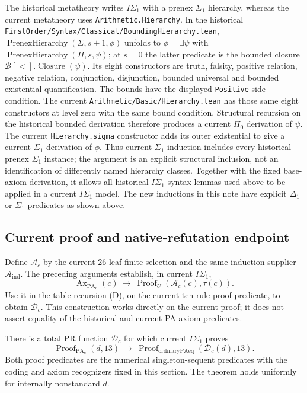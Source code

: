 The historical metatheory writes $I\Sigma_1$ with a prenex
$\Sigma_1$ hierarchy, whereas the current metatheory uses
\texttt{Arithmetic.Hierarchy}.  In the historical
\texttt{FirstOrder/Syntax/Classical/BoundingHierarchy.lean},
$\operatorname{PrenexHierarchy}(\Sigma,s+1,\phi)$ unfolds to
$\phi=\exists\psi$ with
$\operatorname{PrenexHierarchy}(\Pi,s,\psi)$;
at $s=0$ the latter predicate is the bounded closure
$\mathcal B[<].\operatorname{Closure}(\psi)$.
Its eight constructors are truth, falsity, positive relation, negative
relation, conjunction, disjunction, bounded universal and bounded
existential quantification.  The bounds have the displayed
\texttt{Positive} side condition.
The current \texttt{Arithmetic/Basic/Hierarchy.lean} has those same
eight constructors at level zero with the same bound condition.
Structural recursion on the historical bounded derivation therefore
produces a current $\Pi_0$ derivation of $\psi$.  The current
\texttt{Hierarchy.sigma} constructor adds its outer existential to
give a current $\Sigma_1$ derivation of $\phi$.
Thus current $\Sigma_1$ induction includes every historical prenex
$\Sigma_1$ instance; the argument is an explicit structural inclusion,
not an identification of differently named hierarchy classes.
Together with the fixed base-axiom derivation, it allows all historical
$I\Sigma_1$ syntax lemmas used above to be applied in a current
$I\Sigma_1$ model.  The new inductions in this note have explicit
$\Delta_1$ or $\Sigma_1$ predicates as shown above.

\subsection{Current proof and native-refutation endpoint}

Define $\mathcal A_c$ by the current 26-leaf finite selection and
the same induction supplier $\mathcal A_{\mathrm{ind}}$.
The preceding arguments establish, in current $I\Sigma_1$,
\[
 \operatorname{Ax}_{\mathrm{PA}_c}(c)
 \ \longrightarrow\
 \operatorname{Proof}_{U}(\mathcal A_c(c),\tau(c)).
\]
Use it in the table recursion (D), on the current ten-rule proof
predicate, to obtain $\mathcal D_c$.  This construction works
directly on the current proof; it does not assert equality of the
historical and current PA axiom predicates.

\begin{theorem}
There is a total PR function $\mathcal D_c$ for which current
$I\Sigma_1$ proves
\[
 \operatorname{Proof}_{\mathrm{PA}_c}(d,13)
 \ \longrightarrow\
 \operatorname{Proof}_{\mathrm{ordinaryPAeq}}(\mathcal D_c(d),13).
\]
Both proof predicates are the numerical singleton-sequent predicates
with the coding and axiom recognizers fixed in this section.
The theorem holds uniformly for internally nonstandard $d$.
\end{theorem}

